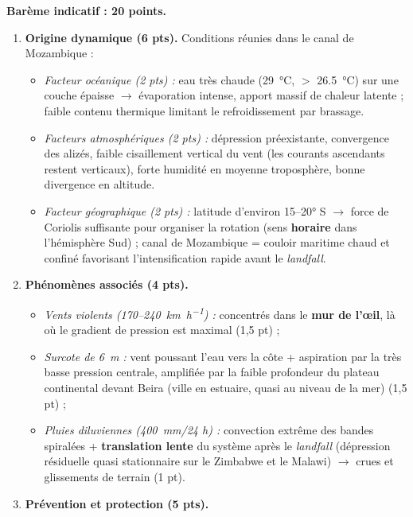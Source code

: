 \documentclass[11pt]{article}
\begin{document}
\begin{corrige}
\textbf{Barème indicatif : 20 points.}

\begin{enumerate}
    \item \textbf{Origine dynamique (6 pts).} Conditions réunies dans le canal de Mozambique :
    \begin{itemize}
        \item \emph{Facteur océanique (2 pts) :} eau très chaude (\SI{29}{\celsius}, $>$ \SI{26,5}{\celsius}) sur une couche épaisse $\rightarrow$ évaporation intense, apport massif de chaleur latente ; faible contenu thermique limitant le refroidissement par brassage.
        \item \emph{Facteurs atmosphériques (2 pts) :} dépression préexistante, convergence des alizés, faible cisaillement vertical du vent (les courants ascendants restent verticaux), forte humidité en moyenne troposphère, bonne divergence en altitude.
        \item \emph{Facteur géographique (2 pts) :} latitude d'environ 15–20° S $\rightarrow$ force de Coriolis suffisante pour organiser la rotation (sens \textbf{horaire} dans l'hémisphère Sud) ; canal de Mozambique = couloir maritime chaud et confiné favorisant l'intensification rapide avant le \emph{landfall}.
    \end{itemize}
    \item \textbf{Phénomènes associés (4 pts).}
    \begin{itemize}
        \item \emph{Vents violents (170–\SI{240}{\kilo\meter\per\hour}) :} concentrés dans le \textbf{mur de l'œil}, là où le gradient de pression est maximal (1,5 pt) ;
        \item \emph{Surcote de \SI{6}{\meter} :} vent poussant l'eau vers la côte + aspiration par la très basse pression centrale, amplifiée par la faible profondeur du plateau continental devant Beira (ville en estuaire, quasi au niveau de la mer) (1,5 pt) ;
        \item \emph{Pluies diluviennes (\SI{400}{\milli\meter}/24 h) :} convection extrême des bandes spiralées + \textbf{translation lente} du système après le \emph{landfall} (dépression résiduelle quasi stationnaire sur le Zimbabwe et le Malawi) $\rightarrow$ crues et glissements de terrain (1 pt).
    \end{itemize}
    \item \textbf{Prévention et protection (5 pts).}

\end{enumerate}
\end{corrige}
\end{document}
